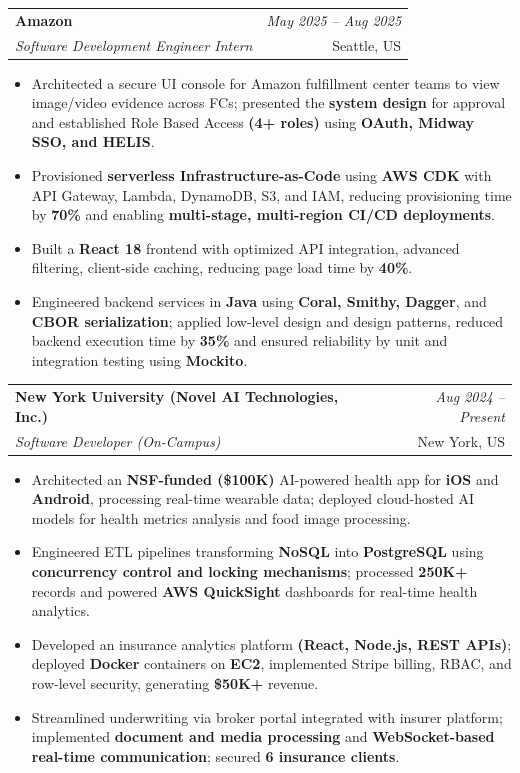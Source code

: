 \documentclass[a4paper,10pt]{article}
\makeatletter
\newcommand{\resumeSubheading}[4]{
\vspace{0.3mm}\item
    \begin{tabular*}{0.98\textwidth}[t]{l@{\extracolsep{\fill}}r}
        \textbf{#1} & \textit{\footnotesize{#4}} \\
        \textit{\footnotesize{#3}} & \footnotesize{#2}\\
    \end{tabular*}\vspace{-2mm}
}
\newcommand{\resumeItemListStart}{\begin{itemize}[leftmargin=*, labelsep=1mm, itemsep=0pt]}
\newcommand{\resumeItemListEnd}{\end{itemize}\vspace{-2mm}}
\makeatother
\begin{document}
\resumeSubheading
{Amazon}{Seattle, US}
{Software Development Engineer Intern}{May 2025 -- Aug 2025}
\resumeItemListStart
\item \footnotesize{Architected a secure UI console for Amazon fulfillment center teams to view image/video evidence across FCs; presented the \textbf{system design} for approval and established Role Based Access \textbf{(4+ roles)} using \textbf{OAuth, Midway SSO, and HELIS}.}
\item \footnotesize{Provisioned \textbf{serverless Infrastructure-as-Code} using \textbf{AWS CDK} with API Gateway, Lambda, DynamoDB, S3, and IAM, reducing provisioning time by \textbf{70\%} and enabling \textbf{multi-stage, multi-region CI/CD deployments}.}
\item \footnotesize{Built a \textbf{React 18} frontend with optimized API integration, advanced filtering, client-side caching, reducing page load time by \textbf{40\%}.}
\item \footnotesize{Engineered backend services in \textbf{Java} using \textbf{Coral, Smithy, Dagger}, and \textbf{CBOR serialization}; applied low-level design and design patterns, reduced backend execution time by \textbf{35\%} and ensured reliability by unit and integration testing using \textbf{Mockito}.}
\resumeItemListEnd

\resumeSubheading
{New York University (Novel AI Technologies, Inc.)}{New York, US}
{Software Developer (On-Campus)}{Aug 2024 -- Present}
\resumeItemListStart
\item \footnotesize{Architected an \textbf{NSF-funded (\$100K)} AI-powered health app for \textbf{iOS} and \textbf{Android}, processing real-time wearable data; deployed cloud-hosted AI models for health metrics analysis and food image processing.}
\item \footnotesize{Engineered ETL pipelines transforming \textbf{NoSQL} into \textbf{PostgreSQL} using \textbf{concurrency control and locking mechanisms}; processed \textbf{250K+} records and powered \textbf{AWS QuickSight} dashboards for real-time health analytics.}
\item \footnotesize{Developed an insurance analytics platform \textbf{(React, Node.js, REST APIs)}; deployed \textbf{Docker} containers on \textbf{EC2}, implemented Stripe billing, RBAC, and row-level security, generating \textbf{\$50K+} revenue.}
\item \footnotesize{Streamlined underwriting via broker portal integrated with insurer platform; implemented \textbf{document and media processing} and \textbf{WebSocket-based real-time communication}; secured \textbf{6 insurance clients}.}
\resumeItemListEnd
\end{document}
